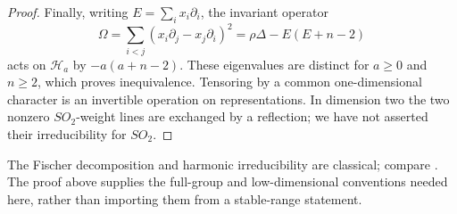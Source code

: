 \begin{proof}
Finally, writing \(E=\sum_i x_i\partial_i\), the invariant operator
\[
 \Omega=\sum_{i<j}(x_i\partial_j-x_j\partial_i)^2
             =\rho\Delta-E(E+n-2)
\]
acts on \(\mathcal H_a\) by \(-a(a+n-2)\).  These eigenvalues
are distinct for \(a\ge0\) and \(n\ge2\), which proves
inequivalence.  Tensoring by a common one-dimensional character is
an invertible operation on representations.  In dimension two the
two nonzero \(SO_2\)-weight lines are exchanged by a reflection;
we have not asserted their irreducibility for \(SO_2\).
\end{proof}

The Fischer decomposition and harmonic irreducibility are classical;
compare \cite[\S1, equations (1)--(3)]{DeBieEelbodeRoels}.
The proof above supplies the full-group and low-dimensional conventions
needed here, rather than importing them from a stable-range statement.
